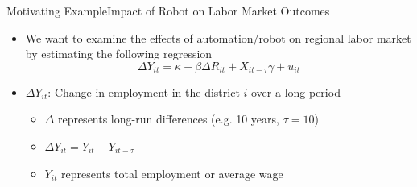 \documentclass[dvipsnames,hyperref={pdfpagelabels=false}]{beamer}
\begin{document}
	
	




	\begin{frame}{Motivating Example}{Impact of Robot on Labor Market Outcomes}
		\begin{itemize}
		\item We want to examine the effects of automation/robot on regional labor market by estimating the following regression
	\vspace{0.2cm}
	\begin{equation*}
		\Delta Y_{it} = \kappa + \beta \Delta R_{it} + X_{it-\tau} \gamma  + u_{it}
	\end{equation*}

		\item $\Delta Y_{it}$: Change in employment in the district $i$ over a long period 
		\vspace{0.2cm}
		\begin{itemize}	
			
			\item $\Delta$ represents long-run differences (e.g. 10 years, $\tau=10$)
			\vspace{0.2cm}
			\item 	$\Delta Y_{it} = Y_{it} - Y_{it-\tau}$
			\vspace{0.2cm}
			\item $Y_{it}$ represents total employment or average wage					
		\end{itemize}	
	
	\end{itemize}
\end{frame}
\end{document}
